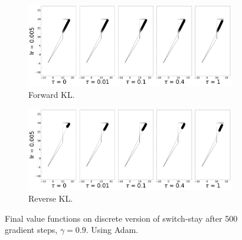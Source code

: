 \documentclass{article}
\begin{document}
\begin{figure}[!htb]
  \centering
  \begin{subfigure}[b]{0.5\linewidth}
    \centering
    \includegraphics[width=0.8\columnwidth]{figs/switch-stay/notlearnQ/polytope_forward_optim=adam.png}
    \caption{Forward KL.}
    \label{fig:switch-stay-forward-adam}
  \end{subfigure}%
  \begin{subfigure}[b]{0.5\linewidth}
        \centering
        \includegraphics[width=0.8\columnwidth]{figs/switch-stay/notlearnQ/polytope_reverse_optim=adam.png}
        \caption{Reverse KL.}
        \label{fig:switch-stay-reverse-adam}
  \end{subfigure}
  \caption{Final value functions on discrete version of switch-stay after 500 gradient steps, $\gamma = 0.9$. Using Adam.}
\end{figure}
\end{document}
